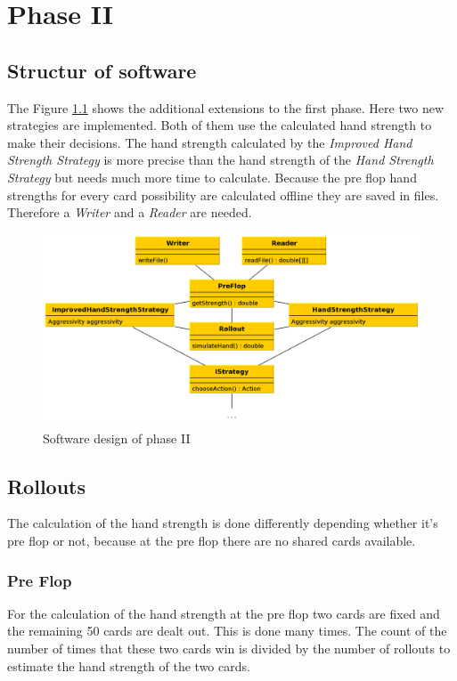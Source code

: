 \chapter{Phase II}

\section{Structur of software}
The Figure \ref{fig:phase2} shows the additional extensions to the first phase. Here two new strategies are implemented. Both of them use the calculated hand strength to make their decisions. The hand strength calculated by the \emph{Improved Hand Strength Strategy} is more precise than the hand strength of the \emph{Hand Strength Strategy} but needs much more time to calculate. Because the pre flop hand strengths for every card possibility are calculated offline they are saved in files. Therefore a \emph{Writer} and a \emph{Reader} are needed.

\begin{figure}[h]
  \centering
  \includegraphics[width=1.0\textwidth]{images/phase2}
  \caption{Software design of phase II}
  \label{fig:phase2}
\end{figure}

\section{Rollouts}
The calculation of the hand strength is done differently depending whether it's pre flop or not, because at the pre flop there are no shared cards available.

\subsection{Pre Flop}
For the calculation of the hand strength at the pre flop two cards are fixed and the remaining 50 cards are dealt out. This is done many times. The count of the number of times that these two cards win is divided by the number of rollouts to estimate the hand strength of the two cards. 

